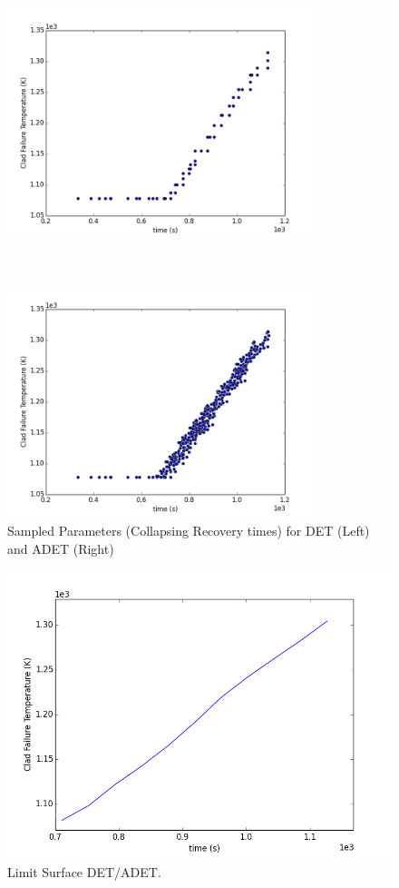 \begin{figure}[h]
 \begin{minipage}[b]{8.5cm}
   \centering
   \includegraphics[width=9cm]{figures/sampledcollapsed_det.png}
 \end{minipage}
 \ \hspace{2mm} \hspace{3mm} \
 \begin{minipage}[b]{8.5cm}
   \centering
   \includegraphics[width=9cm]{figures/sampledcollapsed_adaptivedet.png}
 \end{minipage}
\caption{Sampled Parameters (Collapsing Recovery times) for DET (Left) and ADET (Right)}
\label{fig:SampledCollapsed}
\end{figure}
\begin{figure}[h]
  \centering
     \includegraphics[width=1\textwidth]{figures/LS-2D-DET.png}
  \caption{Limit Surface DET/ADET.}
   \label{fig:LS_DETADET}
\end{figure}


